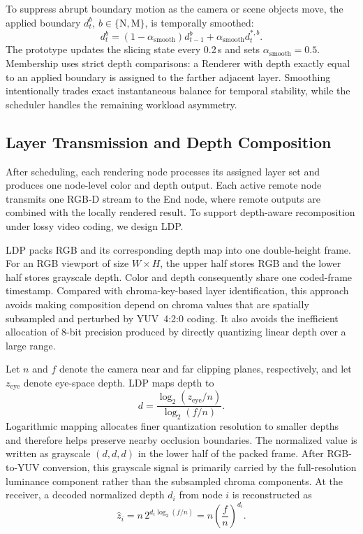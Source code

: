 \documentclass[acmsmall]{acmart}
\begin{document}
To suppress abrupt boundary motion as the camera or scene objects move, the applied boundary $d_t^b$, $b\in\{\mathrm{N},\mathrm{M}\}$, is temporally smoothed:
\begin{equation}
	d_t^b=(1-\alpha_{\mathrm{smooth}})d_{t-1}^b
	+\alpha_{\mathrm{smooth}}d_t^{*,b}.
\end{equation}
	The prototype updates the slicing state every 0.2\,s and sets $\alpha_{\mathrm{smooth}}=0.5$. Membership uses strict depth comparisons: a Renderer with depth exactly equal to an applied boundary is assigned to the farther adjacent layer. Smoothing intentionally trades exact instantaneous balance for temporal stability, while the scheduler handles the remaining workload asymmetry.

	
\subsection{Layer Transmission and Depth Composition}
\label{sec:compositing}
After scheduling, each rendering node processes its assigned layer set and produces one node-level color and depth output. Each active remote node transmits one RGB-D stream to the End node, where remote outputs are combined with the locally rendered result. To support depth-aware recomposition under lossy video coding, we design LDP.

LDP packs RGB and its corresponding depth map into one double-height frame. For an RGB viewport of size $W\times H$, the upper half stores RGB and the lower half stores grayscale depth. Color and depth consequently share one coded-frame timestamp. Compared with chroma-key-based layer identification, this approach avoids making composition depend on chroma values that are spatially subsampled and perturbed by YUV~4:2:0 coding. It also avoids the inefficient allocation of 8-bit precision produced by directly quantizing linear depth over a large range.

Let $n$ and $f$ denote the camera near and far clipping planes, respectively, and let $z_{\mathrm{eye}}$ denote eye-space depth. LDP maps depth to
\begin{equation}
	d=\frac{\log_2(z_{\mathrm{eye}}/n)}{\log_2(f/n)}.
	\label{eq:log_depth}
\end{equation}
Logarithmic mapping allocates finer quantization resolution to smaller depths and therefore helps preserve nearby occlusion boundaries. The normalized value is written as grayscale $(d,d,d)$ in the lower half of the packed frame. After RGB-to-YUV conversion, this grayscale signal is primarily carried by the full-resolution luminance component rather than the subsampled chroma components. At the receiver, a decoded normalized depth $d_i$ from node $i$ is reconstructed as
\begin{equation}
	\widehat z_i=n\,2^{d_i\log_2(f/n)}=n\left(\frac{f}{n}\right)^{d_i}.
\end{equation}
\end{document}
